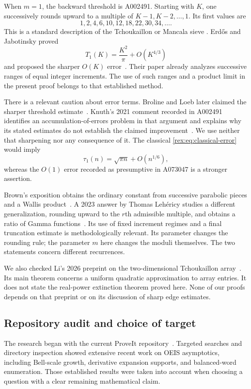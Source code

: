 When $m=1$, the backward threshold is A002491. Starting with $K$, one
successively rounds upward to a multiple of $K-1,K-2,\ldots,1$. Its first
values are
\[
 1,2,4,6,10,12,18,22,30,34,\ldots.
\]
This is a standard description of the Tchoukaillon or Mancala sieve
\cite{oeis-threshold}. Erd\H{o}s and Jabotinsky proved
\begin{equation}\label{rex:eq:classical-error}
 T_1(K)=\frac{K^2}{\pi}+O(K^{4/3})
\end{equation}
and proposed the sharper $O(K)$ error~\cite{erdos-jabotinsky}.
Their paper already analyzes successive ranges of equal integer
increments. The use of such ranges and a product limit in the present
proof belongs to that established method.

There is a relevant caution about error terms. Broline and Loeb later
claimed the sharper threshold estimate~\cite{broline-loeb}. Knuth's 2021
comment recorded in A002491 identifies an accumulation-of-errors problem
in that argument and explains why its stated estimates do not establish
the claimed improvement~\cite{oeis-threshold}. We use neither that
sharpening nor any consequence of it. The classical
\cref{rex:eq:classical-error} would imply
\[
 \tau_1(n)=\sqrt{\pi n}+O(n^{1/6}),
\]
whereas the $O(1)$ error recorded as presumptive in A073047 is a stronger
assertion.

Brown's exposition obtains the ordinary constant from successive
parabolic pieces and a Wallis product~\cite{brown}. A 2023 answer by
Thomas Leh\'ericy studies a different generalization, rounding upward to
the $r$th admissible multiple, and obtains a ratio of Gamma
functions~\cite{lehericy}. Its use of fixed increment regimes and a final
truncation estimate is methodologically relevant. Its parameter changes
the rounding rule; the parameter $m$ here changes the moduli themselves.
The two statements concern different recurrences.

We also checked Li's 2026 preprint on the two-dimensional Tchoukaillon
array~\cite{li}. Its main theorem concerns a uniform quadratic
approximation to array entries. It does not state the real-power
extinction theorem proved here. None of our proofs depends on that
preprint or on its discussion of sharp edge estimates.

\subsection{Repository audit and choice of target}

The research began with the current ProveIt repository~\cite{proveit}.
Targeted searches and directory inspection showed extensive recent
work on OEIS asymptotics, including Bell-scale growth, derivative
expansion supports, and balanced-word enumeration. Those established
results were taken into account when choosing a question with a clear
remaining mathematical claim.

